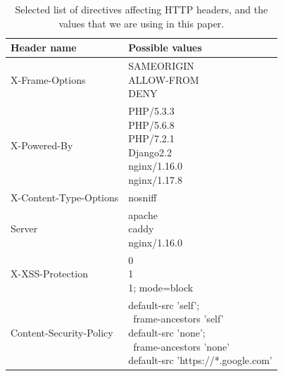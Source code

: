 \documentclass[sigconf]{acmart}
\begin{document}
\begin{table}

  \centering
  \caption{Selected list of directives affecting HTTP headers, and the
  values that we are using in this paper. \label{table:http_headers}}


\begin{tabular}{|l|l|}
\hline
\textbf{Header name}           & \textbf{Possible values} \\ \hline
X-Frame-Options                & \shortstack[l]{SAMEORIGIN \\
  ALLOW-FROM \\ DENY} \\ \hline
X-Powered-By                   & \shortstack[l]{PHP/5.3.3 \\ PHP/5.6.8
  \\ PHP/7.2.1 \\ Django2.2 \\ nginx/1.16.0 \\  nginx/1.17.8} \\ \hline
X-Content-Type-Options         & nosniff \\ \hline
Server                         & \shortstack[l]{apache \\ caddy \\ nginx/1.16.0} \\ \hline
X-XSS-Protection	       & \shortstack[l]{0 \\ 1 \\ 1; mode=block} \\ \hline
Content-Security-Policy	       & \shortstack[l]{default-src 'self';\\~frame-ancestors 'self' \\ default-src 'none';\\~frame-ancestors 'none' \\ default-src 'https://*.google.com'} \\ \hline
\end{tabular}

\end{table}
%
\end{document}
